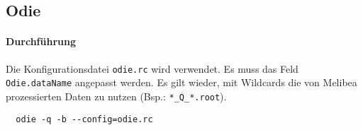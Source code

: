 \subsection{Odie}%
\label{sub:odie}

\paragraph{Durchführung}%

Die Konfigurationsdatei \texttt{odie.rc} wird verwendet.
Es muss das Feld \texttt{Odie.dataName} angepasst werden.
Es gilt wieder, mit Wildcards die von Melibea prozessierten Daten zu nutzen
(Bsp.: \texttt{*\_Q\_*.root}).

\begin{lstlisting}
  odie -q -b --config=odie.rc
\end{lstlisting}
